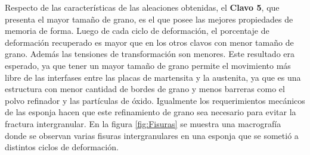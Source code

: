 \documentclass[a4paper,12pt,fleqn,twoside,openany]{book}
\begin{document}
Respecto de las características de las aleaciones obtenidas, el \textbf{Clavo 5}, que presenta el mayor tamaño de grano, es el que posee las mejores propiedades de memoria de forma. Luego de cada ciclo de deformación, el porcentaje de deformación recuperado es mayor que en los otros clavos con menor tamaño de grano. Además las tensiones de transformación son menores. Este resultado era esperado, ya que tener un mayor tamaño de grano permite el movimiento más libre de las interfases entre las placas de martensita y la austenita, ya que es una estructura con menor cantidad de bordes de grano y menos barreras como el polvo refinador y las partículas de óxido. Igualmente los requerimientos mecánicos de las esponja hacen que este refinamiento de grano sea necesario para evitar la fractura intergranular. En la figura \ref{fig:Fisuras} se muestra una macrografía donde se observan varias fisuras intergranulares en una esponja que se sometió a distintos ciclos de deformación.

 
\end{document}
